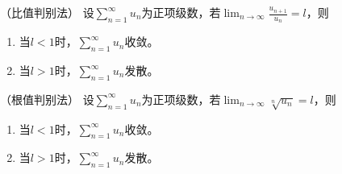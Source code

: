 \begin{theorem}
    （比值判别法）
    \label{th:比值判别法}
    设$\displaystyle\sum_{n=1}^\infty u_n$为正项级数，若$\displaystyle\lim_{n\to\infty}\frac{u_{n+1}}{u_n}=l$，则
    \begin{enumerate}[(1)]
        \item 当$l<1$时，$\displaystyle\sum_{n=1}^\infty u_n$收敛。
        \item 当$l>1$时，$\displaystyle\sum_{n=1}^\infty u_n$发散。
    \end{enumerate}
\end{theorem}
\begin{theorem}
    （根值判别法）
    \label{th:根值判别法}
    设$\displaystyle\sum_{n=1}^\infty u_n$为正项级数，若$\displaystyle\lim_{n\to\infty}\sqrt[n]{u_n}=l$，则
    \begin{enumerate}[(1)]
        \item 当$l<1$时，$\displaystyle\sum_{n=1}^\infty u_n$收敛。
        \item 当$l>1$时，$\displaystyle\sum_{n=1}^\infty u_n$发散。
    \end{enumerate}
\end{theorem}

